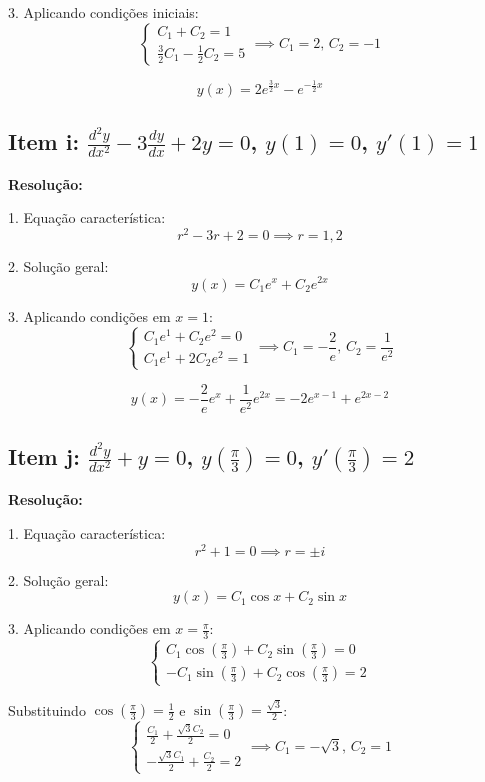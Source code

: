 \documentclass[12pt,a4paper]{article}
\begin{document}
3. Aplicando condições iniciais:
\[
\begin{cases}
C_1 + C_2 = 1 \\
\frac{3}{2}C_1 - \frac{1}{2}C_2 = 5
\end{cases} \implies C_1 = 2, \, C_2 = -1
\]

\[
\boxed{y(x) = 2e^{\frac{3}{2}x} - e^{-\frac{1}{2}x}}
\]

\subsection*{Item i: \(\frac{d^2 y}{dx^2} - 3\frac{dy}{dx} + 2y = 0\), \(y(1) = 0\), \(y'(1) = 1\)}

\textbf{Resolução:}

1. Equação característica:
\[
r^2 - 3r + 2 = 0 \implies r = 1, 2
\]

2. Solução geral:
\[
y(x) = C_1 e^{x} + C_2 e^{2x}
\]

3. Aplicando condições em \(x=1\):
\[
\begin{cases}
C_1 e^{1} + C_2 e^{2} = 0 \\
C_1 e^{1} + 2C_2 e^{2} = 1
\end{cases} \implies C_1 = -\frac{2}{e}, \, C_2 = \frac{1}{e^2}
\]

\[
\boxed{y(x) = -\frac{2}{e}e^{x} + \frac{1}{e^2}e^{2x} = -2e^{x-1} + e^{2x-2}}
\]

\subsection*{Item j: \(\frac{d^2 y}{dx^2} + y = 0\), \(y\left(\frac{\pi}{3}\right) = 0\), \(y'\left(\frac{\pi}{3}\right) = 2\)}

\textbf{Resolução:}

1. Equação característica:
\[
r^2 + 1 = 0 \implies r = \pm i
\]

2. Solução geral:
\[
y(x) = C_1 \cos x + C_2 \sin x
\]

3. Aplicando condições em \(x = \frac{\pi}{3}\):
\[
\begin{cases}
C_1 \cos\left(\frac{\pi}{3}\right) + C_2 \sin\left(\frac{\pi}{3}\right) = 0 \\
-C_1 \sin\left(\frac{\pi}{3}\right) + C_2 \cos\left(\frac{\pi}{3}\right) = 2
\end{cases}
\]

Substituindo \(\cos\left(\frac{\pi}{3}\right) = \frac{1}{2}\) e \(\sin\left(\frac{\pi}{3}\right) = \frac{\sqrt{3}}{2}\):
\[
\begin{cases}
\frac{C_1}{2} + \frac{\sqrt{3}C_2}{2} = 0 \\
-\frac{\sqrt{3}C_1}{2} + \frac{C_2}{2} = 2
\end{cases} \implies C_1 = -\sqrt{3}, \, C_2 = 1
\]
\end{document}
